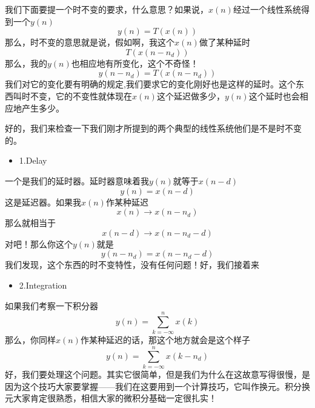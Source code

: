 \documentclass[a4paper,12pt]{article}
\begin{document}
我们下面要提一个时不变的要求，什么意思？如果说，$x(n)$经过一个线性系统得到一个$y(n)$
\begin{equation}
   y(n) = T\left ( x(n) \right )
\end{equation}
那么，时不变的意思就是说，假如啊，我这个$x(n)$做了某种延时
\begin{equation}
   T\left ( x(n-n_d) \right )
\end{equation}
那么，我的$y(n)$也相应地有所变化，这个不奇怪！
\begin{equation}
   y(n-n_d) = T\left ( x(n-n_d) \right )
\end{equation}
我们对它的变化要有明确的规定,我们要求它的变化刚好也是这样的延时。这个东西叫时不变，它的不变性就体现在$x(n)$这个延迟做多少，$y(n)$这个延时也会相应地产生多少。

好的，我们来检查一下我们刚才所提到的两个典型的线性系统他们是不是时不变的。
\begin{itemize}
    \item 1.\quad Delay
\end{itemize}

一个是我们的延时器。延时器意味着我$y(n)$就等于$x(n-d)$
\begin{equation}
   y(n) = x(n-d)
\end{equation}
这是延迟器。如果我$x(n)$作某种延迟
\begin{equation}
   x(n) \longrightarrow x(n-n_d)
\end{equation}
那么就相当于
\begin{equation}
   x(n-d) \longrightarrow x(n-n_d - d)
\end{equation}
对吧！那么你这个$y(n)$就是
\begin{equation}
   y(n-n_d) = x(n-n_d-d)
\end{equation}
我们发现，这个东西的时不变特性，没有任何问题！好，我们接着来
\begin{itemize}
    \item 2.\quad Integration
\end{itemize}

如果我们考察一下积分器
\begin{equation}
   y(n) = \sum_{k=-\infty}^{n}x(k)
\end{equation}
那么，你同样$x(n)$作某种延迟的话，那这个地方就会是这个样子
\begin{equation}
   y(n) = \sum_{k=-\infty}^{n}x(k-n_d)
\end{equation}
好，我们要处理这个问题。其实它很简单，但是我们为什么在这故意写得很慢，是因为这个技巧大家要掌握——我们在这要用到一个计算技巧，它叫作换元。积分换元大家肯定很熟悉，相信大家的微积分基础一定很扎实！
\end{document}

